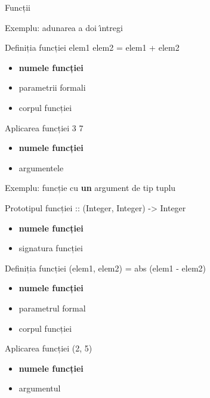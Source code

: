 \documentclass[xcolor=pdftex,romanian,colorlinks]{beamer}
\begin{document}
\begin{section}{Funcții}
\begin{frame}{Exemplu: adunarea a doi \^{\i}ntregi}
\begin{block}{Definiția funcției \hfill {\color{black}{\bf add}} \alert{elem1} \alert{elem2} {\color{black}= elem1 + elem2}}
\begin{itemize}
\item {\bf numele funcției}
\item \alert{parametrii formali}
\item corpul funcției
\end{itemize}
\end{block}
\begin{block}{Aplicarea funcției \hfill {\color{black}{\bf add}} \alert{3} \alert{7}}
\begin{itemize}
\item {\bf numele funcției}
\item \alert{argumentele}
\end{itemize}
\end{block}
\end{frame}

\begin{frame}{Exemplu: funcție cu {\bf un} argument de tip tuplu }
\begin{block}{Prototipul funcției \hfill
{\color{black}{\bf dist} {:: (Integer, Integer)  -> Integer}}}
\begin{itemize}
\item {\bf numele funcției}
\item signatura funcției
\end{itemize}
\end{block}
\begin{block}{Definiția funcției \hfill {\color{black}{\bf dist}} \alert{(elem1, elem2)} {\color{black}= abs (elem1 - elem2)}}

\begin{itemize}
\item {\bf numele funcției}
\item \alert{parametrul  formal}
\item corpul funcției
\end{itemize}
\end{block}
\begin{block}{Aplicarea funcției \hfill {\color{black}{\bf dist}} \alert{(2, 5)}}
\begin{itemize}
\item {\bf numele funcției}
\item \alert{argumentul}
\end{itemize}
\end{block}
\end{frame}



\end{section}
\end{document}
